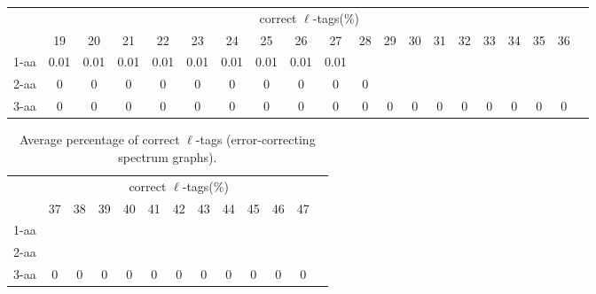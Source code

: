 \documentclass{article}[12pt]
\begin{document}
\begin{landscape}
\begin{table}[h]
\vspace{3mm}
\end{table}
\begin{table}[h]\tiny
\vspace{3mm}
{\centering
\begin{center}
\begin{tabular}{|l|c|c|c|c|c|c|c|c|c|c|c|c|c|c|c|c|c|c|c|}
  \hline
  & \multicolumn{ 18 }{|c|}{correct $\ell$-tags(\%)} \\
  \cline{2- 19}
    & 19 & 20 & 21 & 22 & 23 & 24 & 25 & 26 & 27 & 28 & 29 & 30 & 31 & 32 & 33 & 34 & 35 & 36\\
  \hline
1-aa  & 0.01 & 0.01 & 0.01 & 0.01 & 0.01 & 0.01 & 0.01 & 0.01 & 0.01 &  &  &  &  &  &  &  &  & \\
2-aa  & 0 & 0 & 0 & 0 & 0 & 0 & 0 & 0 & 0 & 0 &  &  &  &  &  &  &  & \\
3-aa  & 0 & 0 & 0 & 0 & 0 & 0 & 0 & 0 & 0 & 0 & 0 & 0 & 0 & 0 & 0 & 0 & 0 & 0\\
 \hline
\end{tabular}
\end{center}
\par}
\centering

\vspace{3mm}
\end{table}
\begin{table}[h]\tiny
\vspace{3mm}
{\centering
\begin{center}
\begin{tabular}{|l|c|c|c|c|c|c|c|c|c|c|c|c|}
  \hline
  & \multicolumn{ 11 }{|c|}{correct $\ell$-tags(\%)} \\
  \cline{2- 12}
    & 37 & 38 & 39 & 40 & 41 & 42 & 43 & 44 & 45 & 46 & 47\\
  \hline
1-aa  &  &  &  &  &  &  &  &  &  &  & \\
2-aa  &  &  &  &  &  &  &  &  &  &  & \\
3-aa  & 0 & 0 & 0 & 0 & 0 & 0 & 0 & 0 & 0 & 0 & 0\\
 \hline
\end{tabular}
\end{center}
\par}
\centering

\caption{ Average percentage of correct $\ell$-tags (error-correcting spectrum graphs).}
\label{table:correct-l-tags-err}

\vspace{3mm}
\end{table}
\end{landscape}
\end{document}
